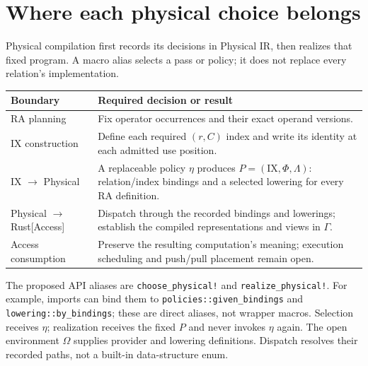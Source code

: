 \section{Where each physical choice belongs}
\label{sec:architecture-placement}
Physical compilation first records its decisions in Physical IR, then realizes
that fixed program. A macro alias selects a pass or policy; it does not replace
every relation's implementation.
\begin{center}\small
\begin{tabular}{>{\raggedright\arraybackslash}p{.22\linewidth}>{\raggedright\arraybackslash}p{.68\linewidth}}
\toprule
Boundary & Required decision or result \\
\midrule
RA planning & Fix operator occurrences and their exact operand versions. \\
IX construction & Define each required $(r,C)$ index and write its identity at
each admitted use position. \\
IX $\to$ Physical & A replaceable policy $\eta$ produces
$P=(\mathrm{IX},\Phi,\Lambda)$: relation/index bindings and a selected lowering
for every RA definition. \\
Physical $\to$\newline Rust[Access] & Dispatch through the recorded bindings and lowerings;
establish the compiled representations and views in $\Gamma$. \\
Access consumption & Preserve the resulting computation's meaning; execution
scheduling and push/pull placement remain open. \\
\bottomrule
\end{tabular}
\end{center}
The proposed API aliases are \texttt{choose\_physical!} and
\texttt{realize\_physical!}. For example, imports can bind them to
\texttt{policies::given\_bindings} and \texttt{lowering::by\_bindings}; these
are direct aliases, not wrapper macros. Selection receives $\eta$;
realization receives the fixed $P$ and never invokes $\eta$ again.
The open environment $\Omega$ supplies provider and lowering definitions.
Dispatch resolves their recorded paths, not a built-in data-structure enum.

